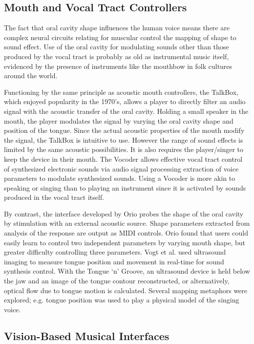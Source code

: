 \subsection{Mouth and Vocal Tract Controllers}

The fact that oral cavity shape influences the human voice means there are complex neural circuits relating for muscular control the mapping of shape to sound effect. Use of the oral cavity for modulating sounds other than those produced by the vocal tract is probably as old as instrumental music itself, evidenced by the presence of instruments like the mouthbow in folk cultures around the world. 

Functioning by the same principle as acoustic mouth controllers, the TalkBox, which enjoyed popularity in the 1970's, allows a player to directly filter an audio signal with the acoustic transfer of the oral cavity. Holding a small speaker in the mouth, the player modulates the signal by varying the oral cavity shape and position of the tongue. Since the actual acoustic properties of the mouth modify the signal, the TalkBox is intuitive to use. However the range of sound effects is limited by the same acoustic possibilities. It is also requires the player/singer to keep the device in their mouth.
The Vocoder \cite{Dudley:1939} allows effective vocal tract control of synthesized electronic sounds via audio signal processing extraction of voice parameters to modulate synthesized sounds. Using a Vocoder is more akin to speaking or singing than to playing an instrument since it is activated by sounds produced in the vocal tract itself.

By contrast, the interface developed by Orio \cite{Orio:1997} probes the shape of the oral cavity by stimulation with an external acoustic source. Shape parameters extracted from analysis of the response are output as MIDI controls. Orio found that users could easily learn to control two independent parameters by varying mouth shape, but greater difficulty controlling three parameters.
Vogt et al. \cite{Vogt:2002} used ultrasound imaging to measure tongue position and movement in real-time for sound synthesis control. With the Tongue ‘n' Groove, an ultrasound device is held below the jaw and an image of the tongue contour reconstructed, or alternatively, optical flow due to tongue motion is calculated. Several mapping metaphors were explored; e.g. tongue position was used to play a physical model of the singing voice.

\subsection{Vision-Based Musical Interfaces}

